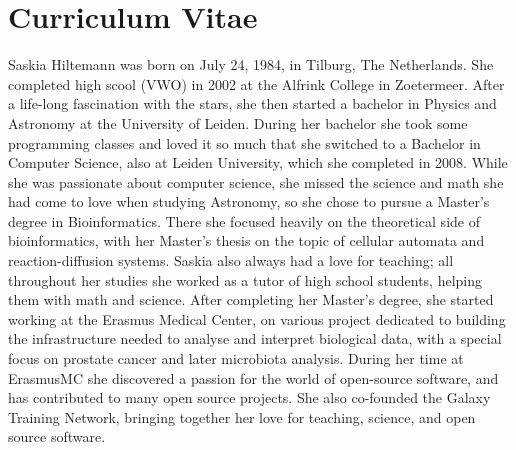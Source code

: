 \chapter{Curriculum Vitae}
\label{AppendixB}

Saskia Hiltemann was born on July 24, 1984, in Tilburg, The Netherlands. She completed high scool (VWO) in 2002 at the Alfrink College in Zoetermeer. After a life-long fascination with the stars, she then started a bachelor in Physics and Astronomy at the University of Leiden. During her bachelor she took some programming classes and loved it so much that she switched to a Bachelor in Computer Science, also at Leiden University, which she completed in 2008. While she was passionate about computer science, she missed the science and math she had come to love when studying Astronomy, so she chose to pursue a Master's degree in Bioinformatics. There she focused heavily on the theoretical side of bioinformatics, with her Master's thesis on the topic of cellular automata and reaction-diffusion systems. Saskia also always had a love for teaching; all throughout her studies she worked as a tutor of high school students, helping them with math and science. After completing her Master's degree, she started working at the Erasmus Medical Center, on various project dedicated to building the infrastructure needed to analyse and interpret biological data, with a special focus on prostate cancer and later microbiota analysis. During her time at ErasmusMC she discovered a passion for the world of open-source software, and has contributed to many open source projects. She also co-founded the Galaxy Training Network, bringing together her love for teaching, science, and open source software.
